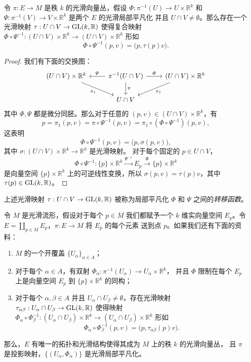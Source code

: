 \begin{lemma}
  令 $\pi:E\to M$ 是秩 $k$ 的光滑向量丛，假设 $\varPhi:\pi^{-1}(U)\to U\times \mathbb{R}^k$
  和 $\varPsi:\pi^{-1}(V)\to V\times \mathbb{R}^k$ 是两个 $E$ 的光滑局部平凡化
  并且 $U\cap V\neq\emptyset$。那么存在一个光滑映射 $\tau:U\cap V\to \operatorname{GL}(k,\mathbb{R})$
  使得复合映射 $\varPhi\circ\varPsi^{-1}:(U\cap V)\times \mathbb{R}^k\to (U\cap V)\times \mathbb{R}^k$
  形如
  \[
    \varPhi\circ\varPsi^{-1}(p,v)=\bigl(p,\tau(p)v\bigr)  .
  \]
\end{lemma}
\begin{proof}
  我们有下面的交换图：
  \[
    \begin{tikzcd}[column sep=2.4em]
      (U\cap V)\times \mathbb{R}^k\arrow[dr,"\pi_1"']
      &
      \pi^{-1}(U\cap V)\arrow[l,"\varPsi"']\arrow[r,"\varPhi"]\arrow[d,"\pi"]
      &
      (U\cap V)\times \mathbb{R}^k\arrow[dl,"\pi_1"]\\
      & 
      U\cap V
      &
    \end{tikzcd}  
  \]
  其中 $\varPhi,\varPsi$ 都是微分同胚。那么对于任意的
  $(p,v)\in(U\cap V)\times \mathbb{R}^k$，有
  \[
    p=\pi_1(p,v)=\pi\circ\varPsi^{-1}(p,v)=\pi_1\circ(\varPhi\circ\varPsi^{-1})
    (p,v),  
  \]
  这表明
  \[
    \varPhi\circ\varPsi^{-1}(p,v)=\bigl(p,\sigma(p,v)\bigr),
  \]
  其中 $\sigma:(U\cap V)\times \mathbb{R}^k\to \mathbb{R}^k$ 是光滑映射。
  对于每个固定的 $p\in U\cap V$，
  \[ 
    \varPhi\circ\varPsi^{-1}:\{p\}\times \mathbb{R}^k\xrightarrow{\varPsi^{-1}}
    E_p\xrightarrow{\varPhi}\{p\}\times \mathbb{R}^k
  \]
  是向量空间 $\{p\}\times \mathbb{R}^k$ 上的可逆线性变换，所以
  $\sigma(p,v)=\tau(p)v$，其中 $\tau(p)\in\operatorname{GL}(k,\mathbb{R})$。
\end{proof}

上述光滑映射 $\tau:U\cap V\to\operatorname{GL}(k,\mathbb{R})$ 被称为局部平凡化
$\varPhi$ 和 $\varPsi$ 之间的\emph{转移函数}。

\begin{lemma}[向量丛坐标卡引理]
  令 $M$ 是光滑流形，假设对于每个 $p\in M$ 我们都赋予一个 $k$ 维实向量空间
  $E_p$。令 $E=\coprod_{p\in M}E_p$，$\pi:E\to M$ 将 $E_p$ 的每个元素
  送到点 $p$。如果我们还有下面的资料：
  \begin{enumerate}
    \item $M$ 的一个开覆盖 $\{U_\alpha\}_{\alpha\in A}$；
    \item 对于每个 $\alpha\in A$，有双射 $\varPhi_\alpha:\pi^{-1}(U_\alpha)\to U_\alpha\times \mathbb{R}^k$，
    并且 $\varPhi$ 限制在每个 $E_p$ 上是向量空间 $E_p$ 到 $\{p\}\times \mathbb{R}^k$ 的同构；
    \item 对于每个 $\alpha,\beta\in A$ 并且 $U_\alpha\cap U_\beta\neq\emptyset$，存在光滑映射
    $\tau_{\alpha\beta}:U_\alpha\cap U_\beta\to \operatorname{GL}(k,\mathbb{R})$ 使得映射
    $\varPhi_\alpha\circ\varPhi_\beta^{-1}:(U_\alpha\cap U_\beta)\times \mathbb{R}^k\to (U_\alpha\cap U_\beta)\times \mathbb{R}^k$
    形如
    \[
      \varPhi_\alpha\circ\varPhi_\beta^{-1}(p,v)=\bigl(p,\tau_{\alpha\beta}(p)v\bigr).  
    \]
  \end{enumerate}
  那么，$E$ 有唯一的拓扑和光滑结构使得其成为 $M$ 上的秩 $k$ 的光滑向量丛，
  且 $\pi$ 是投影映射，$\{(U_\alpha,\varPhi_\alpha)\}$ 是光滑局部平凡化。
\end{lemma}

